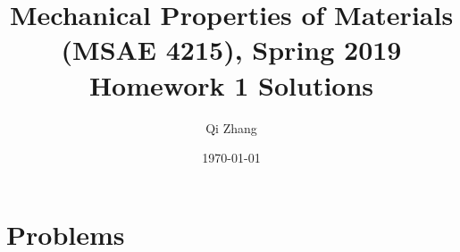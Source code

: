\documentclass[12pt]{article}
\begin{document}

\title{Mechanical Properties of Materials (MSAE 4215), Spring 2019\\ Homework 1 Solutions}
\author{Qi Zhang}
\date{\today}

\maketitle

\tableofcontents

\section{Problems}
\end{document}
